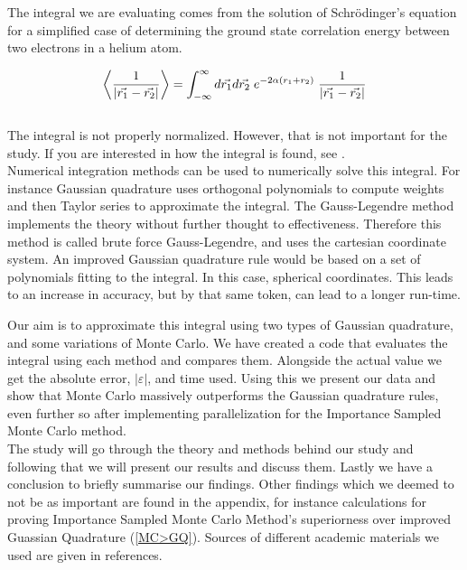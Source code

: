 \documentclass{article}
\begin{document}
The integral we are evaluating comes from the solution of Schrödinger's equation for a simplified case of determining the ground state correlation energy between two electrons in a helium atom.

\begin{equation} \label{eq:integral}
    \left\langle \frac{1}{| \vec{r_1} - \vec{r_2} |} \right\rangle = \int_{-\infty} ^\infty d \vec{r_1} d \vec{r_2} \hspace{1mm} e^{- 2 \alpha (r_1 + r_2)} \hspace{1mm} \frac{1}{| \vec{r_1} - \vec{r_2} |}
\end{equation} \\

The integral is not properly normalized. However, that is not important for the study. If you are interested in how the integral is found, see \cite{task}.\\

Numerical integration methods can be used to numerically solve this integral. For instance Gaussian quadrature uses orthogonal polynomials to compute weights and then Taylor series to approximate the integral. The Gauss-Legendre method implements the theory without further thought to effectiveness. Therefore this method is called brute force Gauss-Legendre, and uses the cartesian coordinate system. An improved Gaussian quadrature rule would be based on a set of polynomials fitting to the integral. In this case, spherical coordinates. This leads to an increase in accuracy, but by that same token, can lead to a longer run-time.

Our aim is to approximate this integral using two types of Gaussian quadrature, and some variations of Monte Carlo. We have created a code that evaluates the integral using each method and compares them. Alongside the actual value we get the absolute error, $|\varepsilon|$, and time used. Using this we present our data and show that Monte Carlo massively outperforms the Gaussian quadrature rules, even further so after implementing parallelization for the Importance Sampled Monte Carlo method.\\

The study will go through the theory and methods behind our study and following that we will present our results and discuss them. Lastly we have a conclusion to briefly summarise our findings. Other findings which we deemed to not be as important are found in the appendix, for instance calculations for proving Importance Sampled Monte Carlo Method's superiorness over improved Guassian Quadrature (\ref{MC>GQ}). Sources of different academic materials we used are given in references. \\
\end{document}
